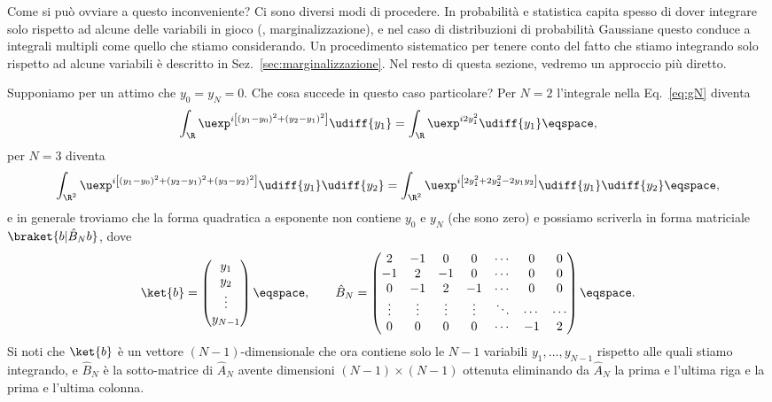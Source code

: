 Come si pu\`o ovviare a questo inconveniente?  Ci sono diversi modi di
procedere. In probabilit\`a e statistica capita spesso di dover integrare solo
rispetto ad alcune delle variabili in gioco (\ie, marginalizzazione), e nel caso
di distribuzioni di probabilit\`a Gaussiane questo conduce a integrali multipli
come quello che stiamo considerando.  Un procedimento sistematico per tenere
conto del fatto che stiamo integrando solo rispetto ad alcune variabili \`e
descritto in Sez.~\ref{sec:marginalizzazione}.  Nel resto di questa sezione,
vedremo un approccio pi\`u diretto.

Supponiamo per un attimo che $y_{0} = y_{N} = 0$.
Che cosa succede in questo caso particolare?
Per $N=2$ l'integrale nella Eq.~\eqref{eq:gN} diventa
\begin{displaymath}
\int_{\R} \uexp^{i \left[ \left( y_{1} - y_{0} \right)^{2} + \left( y_{2} -
y_{1} \right)^{2} \right]} \udiff{y_{1}} = \int_{\R} \uexp^{ i 2
y_{1}^{2} } \udiff{y_{1}}
\eqspace, 
\end{displaymath}
per $N=3$ diventa
\begin{displaymath}
\int_{\R^{2} } \uexp^{i \left[ \left( y_{1} - y_{0} \right)^{2} + \left( y_{2} -
y_{1} \right)^{2} + \left( y_{3} - y_{2} \right)^{2} \right]} \udiff{y_{1}}
\udiff{y_{2} }
 = \int_{\R^{2} } \uexp^{ i \left[ 2y_{1}^{2} + 2y_{2}^{2} - 2 y_{1} y_{2}
\right]} \udiff{y_{1}} \udiff{y_{2}} \eqspace, 
\end{displaymath}
e in generale  troviamo che 
la forma quadratica a esponente non contiene $y_{0}$ e $y_{N}$ (che sono
zero) e possiamo scriverla in forma matriciale  $\braket{b | \hat{B}_{N} b}$, dove
\begin{equation}\label{eq:|b>BN}
\ket{b} = \begin{pmatrix} y_{1} \\ y_{2} \\ \vdots \\ y_{N-1} \end{pmatrix}
\eqspace,  \qquad 
\hat{B}_{N} = 
\begin{pmatrix}  
2      & -1     & 0      & 0      & \cdots & 0      & 0 \\
-1     & 2      & -1     & 0      & \cdots & 0      & 0 \\
0      & -1     & 2      & -1     & \cdots & 0      & 0 \\
\vdots & \vdots & \vdots & \vdots & \ddots & \cdots & \cdots \\
0      & 0      & 0      & 0      & \cdots & -1     & 2
\end{pmatrix} 
\eqspace .
\end{equation}
Si noti che $\ket{b}$ \`e un vettore $(N-1)$-dimensionale che  ora contiene solo le $N-1$ variabili 
 $y_{1}, \ldots, y_{N-1}$ rispetto alle quali stiamo integrando, e
$\hat{B}_{N}$  \`e
la sotto-matrice di $\hat{A}_{N}$ avente dimensioni $(N-1)
\times (N-1)$ ottenuta eliminando da $\hat{A}_{N}$ la prima e l'ultima riga e la
prima e l'ultima colonna.

